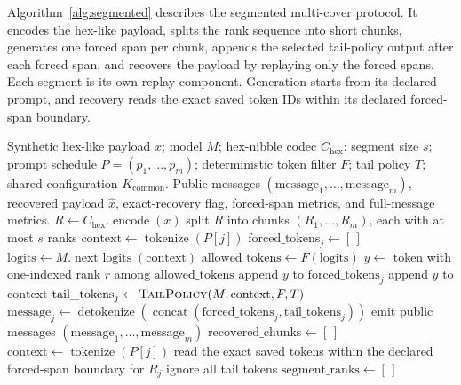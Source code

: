 \documentclass[fleqn,10pt]{wlscirep}
\newcommand{\Encode}{\operatorname{encode}}
\newcommand{\Tokenize}{\operatorname{tokenize}}
\newcommand{\Detokenize}{\operatorname{detokenize}}
\newcommand{\NextLogits}{\operatorname{next\_logits}}
\begin{document}
Algorithm~\ref{alg:segmented} describes the segmented multi-cover protocol. It encodes the hex-like payload, splits the rank sequence into short chunks, generates one forced span per chunk, appends the selected tail-policy output after each forced span, and recovers the payload by replaying only the forced spans. Each segment is its own replay component. Generation starts from its declared prompt, and recovery reads the exact saved token IDs within its declared forced-span boundary.

\begin{algorithm}[H]
\caption{Segmented multi-cover RankCloak trial for distributing a hex-nibble payload across payload-bearing forced spans with non-payload greedy continuations.}
\label{alg:segmented}
\begin{algorithmic}[1]
\Require Synthetic hex-like payload \(x\); model \(M\); hex-nibble codec \(C_{\mathrm{hex}}\); segment size \(s\); prompt schedule \(P=(p_1,\ldots,p_m)\); deterministic token filter \(F\); tail policy \(T\); shared configuration \(K_{\mathrm{common}}\).
\Ensure Public messages \((\mathrm{message}_1,\ldots,\mathrm{message}_m)\), recovered payload \(\hat{x}\), exact-recovery flag, forced-span metrics, and full-message metrics.
\State \(R \gets C_{\mathrm{hex}}.\Encode(x)\)
\State split \(R\) into chunks \((R_1,\ldots,R_m)\), each with at most \(s\) ranks
    \State \(\mathrm{context} \gets \Tokenize(P[j])\)
    \State \(\mathrm{forced\_tokens}_j \gets [\,]\)
        \State \(\mathrm{logits} \gets M.\NextLogits(\mathrm{context})\)
        \State \(\mathrm{allowed\_tokens} \gets F(\mathrm{logits})\)
        \State \(y \gets\) token with one-indexed rank \(r\) among \(\mathrm{allowed\_tokens}\)
        \State append \(y\) to \(\mathrm{forced\_tokens}_j\)
        \State append \(y\) to \(\mathrm{context}\)
    \EndFor
    \State \(\mathrm{tail\_tokens}_j \gets \Call{TailPolicy}{M,\mathrm{context},F,T}\)
    \State \(\mathrm{message}_j \gets \Detokenize(\operatorname{concat}(\mathrm{forced\_tokens}_j,\mathrm{tail\_tokens}_j))\)
\EndFor
\State emit public messages \((\mathrm{message}_1,\ldots,\mathrm{message}_m)\)
\Statex
\State \(\mathrm{recovered\_chunks} \gets [\,]\)
    \State \(\mathrm{context} \gets \Tokenize(P[j])\)
    \State read the exact saved tokens within the declared forced-span boundary for \(R_j\)
    \State ignore all tail tokens
    \State \(\mathrm{segment\_ranks} \gets [\,]\)

\end{algorithmic}
\end{algorithm}
\end{document}
